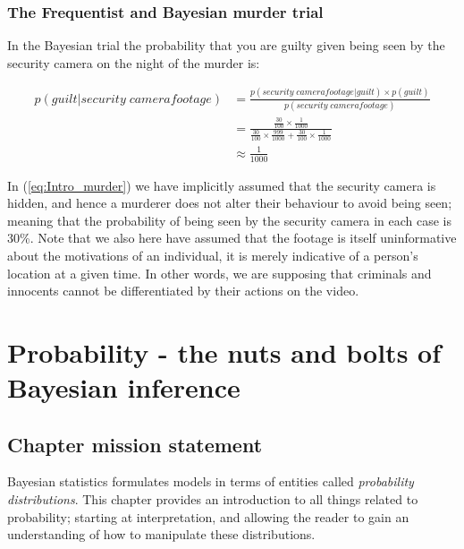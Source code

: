 \documentclass[11pt,fullpage]{book}
\begin{document}
\subsection{The Frequentist and Bayesian murder trial}\label{sec:Intro_appendixMurder}
In the Bayesian trial the probability that you are guilty given being seen by the security camera on the night of the murder is:

\begin{equation}\label{eq:Intro_murder}
\begin{align}
p(guilt|security\; camera footage) &= \frac{p(security\; camera footage|guilt)\times p(guilt)}{p(security\; camera footage)}\\
&= \frac{\frac{30}{100}\times \frac{1}{1000}}{\frac{30}{100}\times \frac{999}{1000}+\frac{30}{100}\times \frac{1}{1000}}\\
&\approx \frac{1}{1000}
\end{align}
\end{equation}

In (\ref{eq:Intro_murder}) we have implicitly assumed that the security camera is hidden, and hence a murderer does not alter their behaviour to avoid being seen; meaning that the probability of being seen by the security camera in each case is 30\%. Note that we also here have assumed that the footage is itself uninformative about the motivations of an individual, it is merely indicative of a person's location at a given time. In other words, we are supposing that criminals and innocents cannot be differentiated by their actions on the video.

\chapter{Probability - the nuts and bolts of Bayesian inference}\label{chap:Probability}
\section{Chapter mission statement}
Bayesian statistics formulates models in terms of entities called \textit{probability distributions}. This chapter provides an introduction to all things related to probability; starting at interpretation, and allowing the reader to gain an understanding of how to manipulate these distributions.
\end{document}
